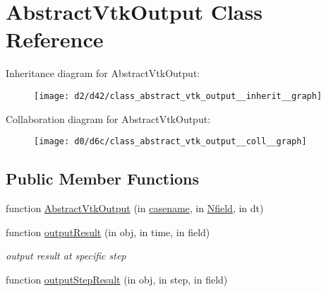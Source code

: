 \hypertarget{class_abstract_vtk_output}{}\section{Abstract\+Vtk\+Output Class Reference}
\label{class_abstract_vtk_output}


Inheritance diagram for Abstract\+Vtk\+Output\+:
\nopagebreak
\begin{figure}[H]
\begin{center}
\leavevmode
\texttt{[image: d2/d42/class\_abstract\_vtk\_output\_\_inherit\_\_graph]}
\end{center}
\end{figure}


Collaboration diagram for Abstract\+Vtk\+Output\+:
\nopagebreak
\begin{figure}[H]
\begin{center}
\leavevmode
\texttt{[image: d0/d6c/class\_abstract\_vtk\_output\_\_coll\_\_graph]}
\end{center}
\end{figure}
\subsection*{Public Member Functions}
\begin{DoxyCompactItemize}
\item 
function \hyperlink{class_abstract_vtk_output_a26719cf6e2b32996c8769124dc3c7a1d}{Abstract\+Vtk\+Output} (in \hyperlink{class_abstract_output_file_a84df82b3a07c6e5eb1f92f21a74fa1e4}{casename}, in \hyperlink{class_abstract_output_file_afdf632429d019dff27d7f29102512101}{Nfield}, in dt)
\item 
function \hyperlink{class_abstract_vtk_output_a8347d450980c3078c5c606236c07e9f4}{output\+Result} (in obj, in time, in field)
\begin{DoxyCompactList}\small\item\em output result at specific step \end{DoxyCompactList}\item 
function \hyperlink{class_abstract_vtk_output_ab52d8372ef118e60eedc7c9ba3c75881}{output\+Step\+Result} (in obj, in step, in field)
\end{DoxyCompactItemize}

